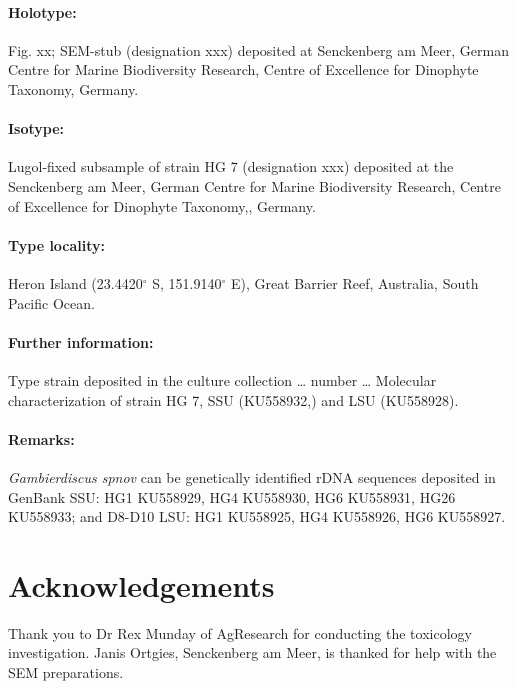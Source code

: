 \documentclass[12pt]{article}
\begin{document}
\paragraph{Holotype:} Fig. xx; SEM-stub (designation xxx) deposited at Senckenberg am Meer, German Centre for Marine Biodiversity Research, Centre of Excellence for Dinophyte Taxonomy, Germany.  \\

\paragraph{Isotype:}Lugol-fixed subsample of strain HG 7 (designation xxx) deposited at the Senckenberg am Meer, German Centre for Marine Biodiversity Research, Centre of Excellence for Dinophyte Taxonomy,, Germany.  \\

\paragraph{Type locality:} Heron Island (23.4420$^{\circ}$ S, 151.9140$^{\circ}$ E), Great Barrier Reef, Australia, South Pacific Ocean.
\paragraph{Further information:} Type strain deposited in the culture collection … number … Molecular characterization of strain HG 7, SSU (KU558932,) and LSU (KU558928).
\paragraph{Remarks:} \emph{Gambierdiscus spnov} can be genetically identified rDNA sequences deposited in GenBank SSU: HG1 KU558929, HG4 KU558930, HG6 KU558931, HG26 KU558933; and D8-D10 LSU: HG1 KU558925, HG4 KU558926, HG6 KU558927. 

\newpage
\section{Acknowledgements}
Thank you to Dr Rex Munday of AgResearch for conducting the toxicology investigation. Janis Ortgies, Senckenberg am Meer, is thanked for help with the SEM preparations.
\end{document}
